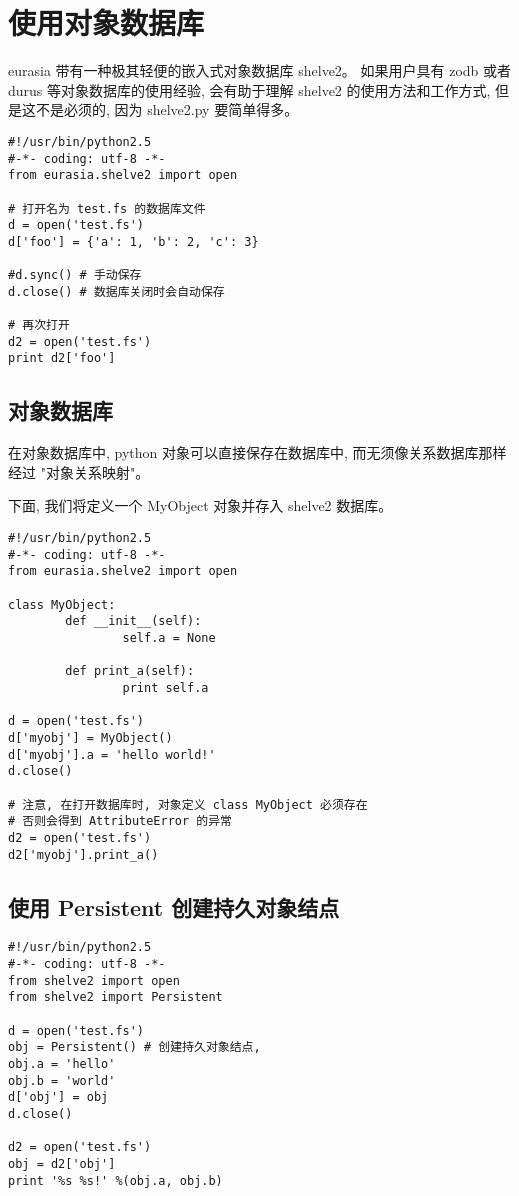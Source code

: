 \documentclass{manual}
\begin{document}
\section{使用对象数据库}

eurasia 带有一种极其轻便的嵌入式对象数据库 shelve2。
如果用户具有 zodb 或者 durus 等对象数据库的使用经验,
会有助于理解 shelve2 的使用方法和工作方式, 但是这不是必须的, 因为 shelve2.py 要简单得多。

\begin{verbatim}
#!/usr/bin/python2.5
#-*- coding: utf-8 -*-
from eurasia.shelve2 import open

# 打开名为 test.fs 的数据库文件
d = open('test.fs')
d['foo'] = {'a': 1, 'b': 2, 'c': 3}

#d.sync() # 手动保存
d.close() # 数据库关闭时会自动保存

# 再次打开
d2 = open('test.fs')
print d2['foo']
\end{verbatim}

\subsection{对象数据库}

在对象数据库中, python 对象可以直接保存在数据库中, 而无须像关系数据库那样经过 "对象关系映射"。

下面, 我们将定义一个 MyObject 对象并存入 shelve2 数据库。

\begin{verbatim}
#!/usr/bin/python2.5
#-*- coding: utf-8 -*-
from eurasia.shelve2 import open

class MyObject:
        def __init__(self):
                self.a = None

        def print_a(self):
                print self.a

d = open('test.fs')
d['myobj'] = MyObject()
d['myobj'].a = 'hello world!'
d.close()

# 注意, 在打开数据库时, 对象定义 class MyObject 必须存在
# 否则会得到 AttributeError 的异常
d2 = open('test.fs')
d2['myobj'].print_a()
\end{verbatim}

\subsection{使用 Persistent 创建持久对象结点}

\begin{verbatim}
#!/usr/bin/python2.5
#-*- coding: utf-8 -*-
from shelve2 import open
from shelve2 import Persistent

d = open('test.fs')
obj = Persistent() # 创建持久对象结点,
obj.a = 'hello'
obj.b = 'world'
d['obj'] = obj
d.close()

d2 = open('test.fs')
obj = d2['obj']
print '%s %s!' %(obj.a, obj.b)
\end{verbatim}
\end{document}
